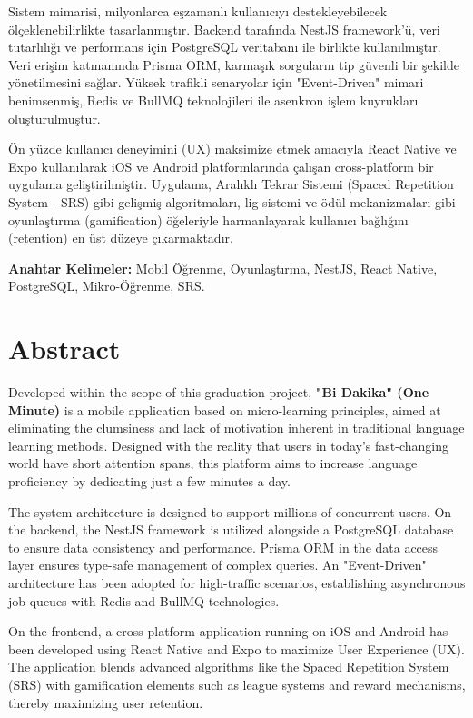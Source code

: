 \documentclass[12pt,a4paper]{report}
\begin{document}
Sistem mimarisi, milyonlarca eşzamanlı kullanıcıyı destekleyebilecek ölçeklenebilirlikte tasarlanmıştır. Backend tarafında NestJS framework'ü, veri tutarlılığı ve performans için PostgreSQL veritabanı ile birlikte kullanılmıştır. Veri erişim katmanında Prisma ORM, karmaşık sorguların tip güvenli bir şekilde yönetilmesini sağlar. Yüksek trafikli senaryolar için "Event-Driven" mimari benimsenmiş, Redis ve BullMQ teknolojileri ile asenkron işlem kuyrukları oluşturulmuştur.

Ön yüzde kullanıcı deneyimini (UX) maksimize etmek amacıyla React Native ve Expo kullanılarak iOS ve Android platformlarında çalışan cross-platform bir uygulama geliştirilmiştir. Uygulama, Aralıklı Tekrar Sistemi (Spaced Repetition System - SRS) gibi gelişmiş algoritmaları, lig sistemi ve ödül mekanizmaları gibi oyunlaştırma (gamification) öğeleriyle harmanlayarak kullanıcı bağlığını (retention) en üst düzeye çıkarmaktadır.

\textbf{Anahtar Kelimeler:} Mobil Öğrenme, Oyunlaştırma, NestJS, React Native, PostgreSQL, Mikro-Öğrenme, SRS.

\newpage

\chapter*{Abstract}

Developed within the scope of this graduation project, \textbf{"Bi Dakika" (One Minute)} is a mobile application based on micro-learning principles, aimed at eliminating the clumsiness and lack of motivation inherent in traditional language learning methods. Designed with the reality that users in today's fast-changing world have short attention spans, this platform aims to increase language proficiency by dedicating just a few minutes a day.

The system architecture is designed to support millions of concurrent users. On the backend, the NestJS framework is utilized alongside a PostgreSQL database to ensure data consistency and performance. Prisma ORM in the data access layer ensures type-safe management of complex queries. An "Event-Driven" architecture has been adopted for high-traffic scenarios, establishing asynchronous job queues with Redis and BullMQ technologies.

On the frontend, a cross-platform application running on iOS and Android has been developed using React Native and Expo to maximize User Experience (UX). The application blends advanced algorithms like the Spaced Repetition System (SRS) with gamification elements such as league systems and reward mechanisms, thereby maximizing user retention.
\end{document}
